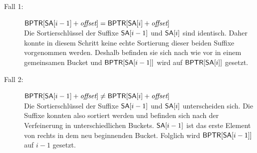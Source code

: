 \begin{description}
	\item[Fall 1:]\(\bptr[\sa[i-1]+\offset] = \bptr[\sa[i]+\offset]\) \\
		Die Sortierschlüssel der Suffixe \(\sa[i-1]\) und \(\sa[i]\) sind identisch. Daher konnte in diesem Schritt keine echte Sortierung dieser beiden Suffixe vorgenommen werden. Deshalb befinden sie sich nach wie vor in einem gemeinsamen Bucket und \(\bptr[\sa[i-1]]\) wird auf \(\bptr[\sa[i]]\) gesetzt.
	\item[Fall 2:] \(\bptr[\sa[i-1]+\offset] \neq \bptr[\sa[i]+\offset]\) \\
		Die Sortierschlüssel der Suffixe \(\sa[i-1]\) und \(\sa[i]\) unterscheiden sich. Die Suffixe konnten also sortiert werden und befinden sich nach der Verfeinerung in unterschiedlichen Buckets. \(\sa[i-1]\) ist das erste Element von rechts in dem neu beginnenden Bucket. Folglich wird \(\bptr[\sa[i-1]]\) auf \(i-1\) gesetzt.
\end{description}

